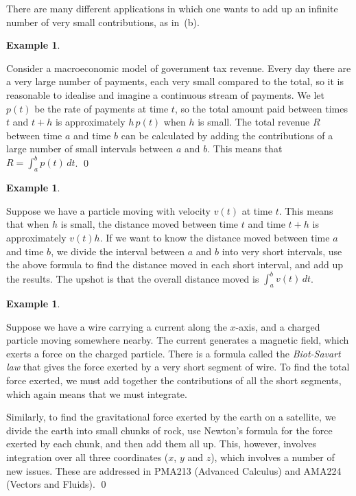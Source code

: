 \documentclass[a4paper]{book}
\newcommand{\PURPLE}[1]{{\color{purple}#1}}
\renewcommand{\:}{\colon}
\newcommand{\PMA}[1]{PMA#1}
\newcommand{\bilabel}[1]{\hypertarget{#1}{\label{#1}}}
\newcommand{\DEFN}[1]{\PURPLE{\emph{#1}}}
\theoremstyle{definition}
\newtheorem{example}[theorem]{Example}
\begin{document}
There are many different applications in which one wants to add up an
infinite number of very small contributions, as in~(b).
\begin{example}\bilabel{eg-tax}
 Consider a macroeconomic model of government tax revenue.  Every day
 there are a very large number of payments, each very small compared
 to the total, so it is reasonable to idealise and imagine a
 continuous stream of payments.  We let $p(t)$ be the rate of payments
 at time $t$, so the total amount paid between times $t$ and $t+h$ is
 approximately $h\,p(t)$ when $h$ is small.  The total revenue $R$
 between time $a$ and time $b$ can be calculated by adding the
 contributions of a large number of small intervals between $a$ and
 $b$.  This means that $R=\int_a^b p(t)\,dt$. \qed
\end{example}
\begin{example}\bilabel{eg-int-vel}
 Suppose we have a particle moving with velocity $v(t)$ at time $t$.
 This means that when $h$ is small, the distance moved between time
 $t$ and time $t+h$ is approximately $v(t)h$.  If we want to know the
 distance moved between time $a$ and time $b$, we divide the interval
 between $a$ and $b$ into very short intervals, use the above formula
 to find the distance moved in each short interval, and add up the
 results.  The upshot is that the overall distance moved is
 $\int_a^b v(t)\,dt$.
\end{example}
\begin{example}\bilabel{eg-biot}
 Suppose we have a wire carrying a current along the $x$-axis, and a
 charged particle moving somewhere nearby.  The current generates a
 magnetic field, which exerts a force on the charged particle.  There
 is a formula called the \DEFN{Biot-Savart law} that gives the force
 exerted by a very short segment of wire.  To find the total force
 exerted, we must add together the contributions of all the short
 segments, which again means that we must integrate.
 
 Similarly, to find the gravitational force exerted by the earth on a
 satellite, we divide the earth into small chunks of rock, use
 Newton's formula for the force exerted by each chunk, and then add
 them all up.  This, however, involves integration over all three
 coordinates ($x$, $y$ and $z$), which involves a number of new
 issues.  These are addressed in \PMA{213} (Advanced Calculus) and
 AMA224 (Vectors and Fluids).
 \qed
\end{example}
\end{document}
